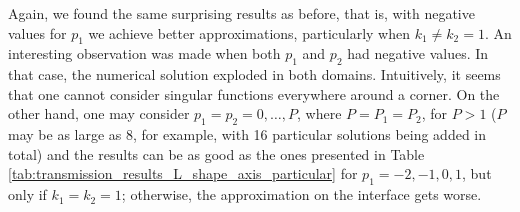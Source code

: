 


Again, we found the same surprising results as before, that is, with negative values for \(p_1\) we achieve better approximations, particularly when \(k_1 \neq k_2 = 1\). An interesting observation was made when both \(p_1\) and \(p_2\) had negative values. In that case, the numerical solution exploded in both domains. Intuitively, it seems that one cannot consider singular functions everywhere around a corner. On the other hand, one may consider \(p_1 = p_2 = 0, \dots, P\), where \(P=P_1=P_2\), for \(P > 1\) (\(P\) may be as large as 8, for example, with 16 particular solutions being added in total) and the results can be as good as the ones presented in Table \ref{tab:transmission_results_L_shape_axis_particular} for \(p_1=-2, -1, 0, 1\), but only if \(k_1=k_2=1\); otherwise, the approximation on the interface gets worse. 

